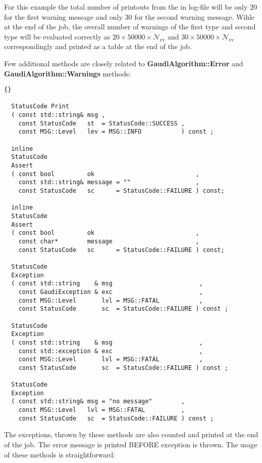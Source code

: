 \documentclass{lhcbnote}
\newcommand{\bftt}         {\ttfamily\bfseries}
\begin{document}
For this example the total number of printouts from the in log-file
will be only 20 for the first warning message and only 30 for the second 
warning message. Wihle at the end of the job, the overall 
number of warnings of the first type and second type will 
be evaluated correctly as 
$20\times50000\times{\mathcal{N}}_{\mathrm{ev}}$ and 
$30\times50000\times{\mathcal{N}}_{\mathrm{ev}}$ 
correspondingly and printed as a table at the end of the job.


Few additional methods are closely related to 
{\bftt{GaudiAlgorithm::Error}} and 
{\bftt{GaudiAlgorithm::Warnings}} methods:

\begin{scriptsize}
 \begin{lstlisting}{}

  StatusCode Print     
  ( const std::string& msg , 
    const StatusCode   st  = StatusCode::SUCCESS ,
    const MSG::Level   lev = MSG::INFO           ) const ;
  
  inline 
  StatusCode
  Assert 
  ( const bool         ok                            , 
    const std::string& message = ""                  , 
    const StatusCode   sc      = StatusCode::FAILURE ) const;
  
  inline 
  StatusCode 
  Assert 
  ( const bool         ok                            , 
    const char*        message                       ,
    const StatusCode   sc      = StatusCode::FAILURE ) const;
  
  StatusCode 
  Exception 
  ( const std::string    & msg                        ,  
    const GaudiException & exc                        , 
    const MSG::Level       lvl = MSG::FATAL           ,
    const StatusCode       sc  = StatusCode::FAILURE ) const ;
  
  StatusCode 
  Exception 
  ( const std::string    & msg                        ,  
    const std::exception & exc                        , 
    const MSG::Level       lvl = MSG::FATAL           ,
    const StatusCode       sc  = StatusCode::FAILURE ) const ;
  
  StatusCode 
  Exception 
  ( const std::string& msg = "no message"        ,  
    const MSG::Level   lvl = MSG::FATAL          ,
    const StatusCode   sc  = StatusCode::FAILURE ) const ;

 \end{lstlisting}
\end{scriptsize}

The exceptions, thrown by these methods are also counted 
and printed at the end of the job. The error message is 
printed BEFORE exception is thrown. The usage of these 
methods is straightforward: 
\end{document}
